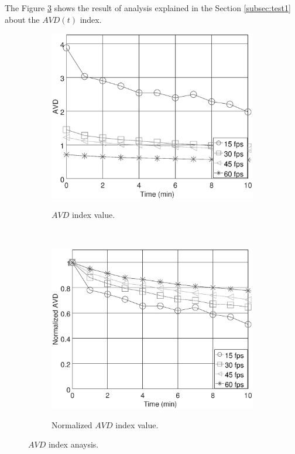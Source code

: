 \documentclass[review]{elsarticle}
\begin{document}
The Figure \ref{fig:AVDtest1} shows the result of analysis explained in the 
Section \ref{subsec:test1} about the $AVD(t)$ index.
\begin{figure}[ht!]
    \centering
    \begin{subfigure}{0.48\textwidth}
        \caption{$AVD$ index value.}
        \includegraphics[width=\textwidth]{FPS_f11_rawAVD.eps}
        \label{fig:avdraw}
    \end{subfigure}
    ~ %
    \begin{subfigure}{0.48\textwidth}
        \caption{Normalized $AVD$ index value.}
        \includegraphics[width=\textwidth]{FPS_f11_norm1AVD.eps}
        \label{fig:avdnorm}
    \end{subfigure}
    \caption{$AVD$ index anaysis.}\label{fig:AVDtest1}
\end{figure}
\end{document}
